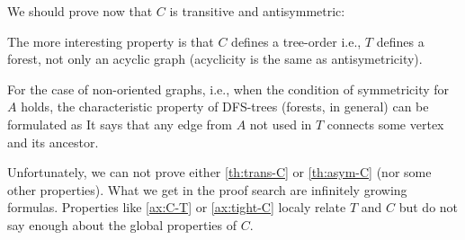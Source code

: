 We should prove now that $C$ is transitive and antisymmetric:

The more interesting property is that $C$ defines a tree-order
 i.e., $T$ defines a forest, not only an acyclic graph
(acyclicity is the same as antisymetricity).

For the case of non-oriented graphs, i.e., when the condition of symmetricity
for $A$
holds, the characteristic property of DFS-trees (forests, in general) can
be formulated as
It says that any edge from $A$ not used in $T$ connects some vertex and its
ancestor. 

Unfortunately, we can not prove either \ref{th:trans-C} or
\ref{th:asym-C} (nor some other properties). What we get in the proof search are
infinitely growing formulas. Properties like \ref{ax:C-T} or
\ref{ax:tight-C} localy relate $T$ and $C$ but do not say enough about the global
properties of $C$.  

